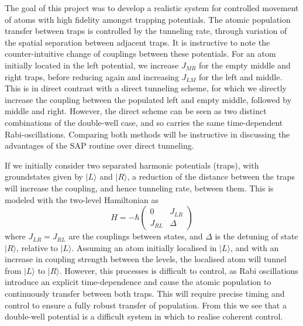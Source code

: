 The goal of this project was to develop a realistic system for controlled movement of atoms with high fidelity amongst trapping potentials. The atomic population transfer between traps is controlled by the tunneling rate, through variation of the spatial separation between adjacent traps. It is instructive to note the counter-intuitive change of couplings between these potentials. For an atom initially located in the left potential, we increase $J_{MR}$ for the empty middle and right traps, before reducing again and increasing $J_{LM}$ for the left and middle. This is in direct contrast with a direct tunneling scheme, for which we directly increase the coupling between the populated left and empty middle, followed by middle and right. However, the direct scheme can be seen as two distinct combinations of the double-well case, and so carries the same time-dependent Rabi-oscillations. Comparing both methods will be instructive in discussing the advantages of the SAP routine over direct tunneling. %

If we initially consider two separated harmonic potentials (traps), with groundstates given by $| L \rangle$ and $| R \rangle$, a reduction of the distance between the traps will increase the coupling, and hence tunneling rate, between them. This is modeled with the two-level Hamiltonian as
\begin{equation}
    H = -\hbar
    \begin{pmatrix}
        0 & J_{LR} \\
        J_{RL} & \Delta
    \end{pmatrix}
\end{equation}
where $J_{LR} = J_{RL}$ are the couplings between states, and $\Delta$ is the detuning of state $| R \rangle$, relative to $| L \rangle$. Assuming an atom initially localised in $| L \rangle$, and with an increase in coupling strength between the levels, the localised atom will tunnel from $| L \rangle$ to $| R \rangle $. However, this processes is difficult to control, as Rabi oscillations introduce an explicit time-dependence and cause the atomic population to continuously transfer between both traps. This will require precise timing and control to ensure a fully robust transfer of population. From this we see that a double-well potential is a difficult system in which to realise coherent control.

